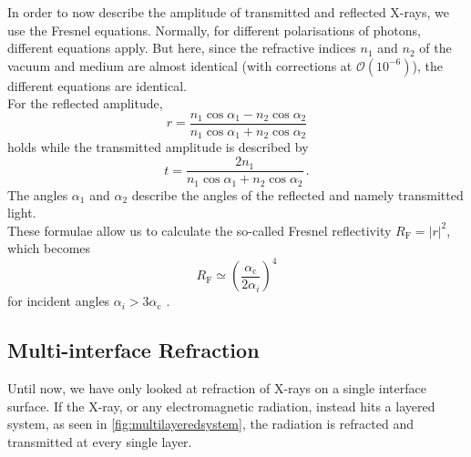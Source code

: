 In order to now describe the amplitude of transmitted and reflected X-rays, we use the Fresnel equations.
Normally, for different polarisations of photons, different equations apply.
But here, since the refractive indices $n_1$ and $n_2$ of the vacuum and medium are almost identical (with corrections at $\mathcal{O}(10^{-6})$),
the different equations are identical. \\
For the reflected amplitude,
\begin{equation}
    r = \frac{n_1 \cos \alpha_1 - n_2 \cos\alpha_2}{n_1 \cos \alpha_1 + n_2 \cos\alpha_2}
    \label{eq:reflectedamplitude}
\end{equation}
holds while the transmitted amplitude is described by
\begin{equation}
    t = \frac{2 n_1}{n_1 \cos \alpha_1 + n_2 \cos\alpha_2} \,.
    \label{eq:transmittedamplitude}
\end{equation}
The angles $\alpha_1$ and $\alpha_2$ describe the angles of the reflected and namely transmitted light. \\

These formulae allow us to calculate the so-called Fresnel reflectivity $R_\text{F} = |r|^2$, which becomes
\begin{equation}
    R_\text{F} \simeq \left(\frac{\alpha_\text{c}}{2\alpha_i}\right)^4
    \label{eq:fresnelreflectivity}
\end{equation}
for incident angles $\alpha_i > 3 \alpha_\text{c}$ \cite{tolan}.


\subsection{Multi-interface Refraction}

Until now, we have only looked at refraction of X-rays on a single interface surface.
If the X-ray, or any electromagnetic radiation, instead hits a layered system, as seen in \autoref{fig:multilayeredsystem}, the radiation is refracted and transmitted at every single layer.

